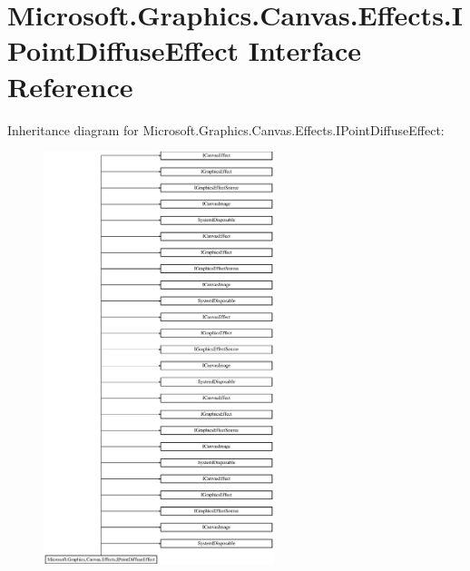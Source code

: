 \hypertarget{interface_microsoft_1_1_graphics_1_1_canvas_1_1_effects_1_1_i_point_diffuse_effect}{}\section{Microsoft.\+Graphics.\+Canvas.\+Effects.\+I\+Point\+Diffuse\+Effect Interface Reference}
\label{interface_microsoft_1_1_graphics_1_1_canvas_1_1_effects_1_1_i_point_diffuse_effect}
Inheritance diagram for Microsoft.\+Graphics.\+Canvas.\+Effects.\+I\+Point\+Diffuse\+Effect\+:\begin{figure}[H]
\begin{center}
\leavevmode
\includegraphics[height=12.000000cm]{interface_microsoft_1_1_graphics_1_1_canvas_1_1_effects_1_1_i_point_diffuse_effect}
\end{center}
\end{figure}
